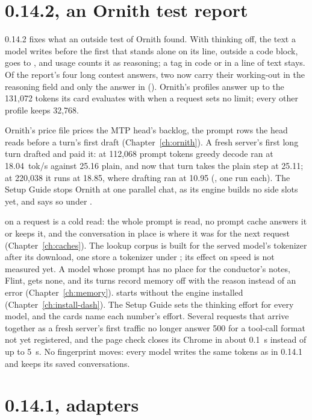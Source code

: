 \section{0.14.2, an Ornith test report}\label{sec:changelog-0142}

0.14.2 fixes what an outside test of Ornith found. With thinking off, the text a model writes before the first  that stands alone on its line, outside a code block, goes to , and usage counts it as reasoning; a tag in code or in a line of text stays. Of the report's four long contest answers, two now carry their working-out in the reasoning field and only the answer in  (\measured). Ornith's profiles answer up to the 131,072 tokens its card evaluates with when a request sets no limit; every other profile keeps 32,768.

Ornith's price file prices the MTP head's backlog, the prompt rows the head reads before a turn's first draft (Chapter~\ref{ch:ornith}). A fresh server's first long turn drafted and paid it: at 112,068 prompt tokens greedy decode ran at 18.04~tok/s against 25.16 plain, and now that turn takes the plain step at 25.11; at 220,038 it runs at 18.85, where drafting ran at 10.95 (\measured, one run each). The Setup Guide stops Ornith at one parallel chat, as its engine builds no side slots yet, and  says so under .

 on a request is a cold read: the whole prompt is read, no prompt cache answers it or keeps it, and the conversation in place is where it was for the next request (Chapter~\ref{ch:caches}). The lookup corpus is built for the served model's tokenizer after its download, one store a tokenizer under ; its effect on speed is not measured yet. A model whose prompt has no place for the conductor's notes, Flint, gets none, and its turns record memory off with the reason instead of an error (Chapter~\ref{ch:memory}).  starts without the engine installed (Chapter~\ref{ch:install-dash}). The Setup Guide sets the thinking effort for every model, and the cards name each number's effort. Several requests that arrive together as a fresh server's first traffic no longer answer 500 for a tool-call format not yet registered, and the page check closes its Chrome in about 0.1~s instead of up to 5~s. No fingerprint moves: every model writes the same tokens as in 0.14.1 and keeps its saved conversations.

\section{0.14.1, adapters}\label{sec:changelog-0141}

